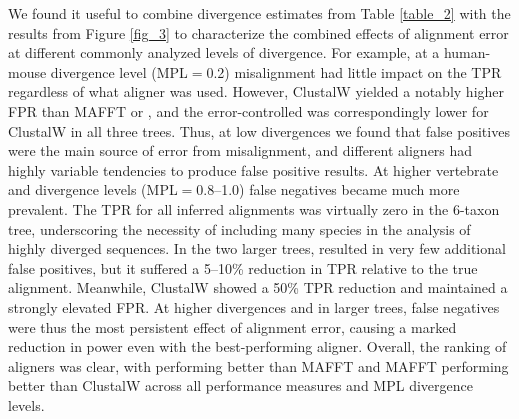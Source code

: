 \documentclass{article}
\begin{document}
We found it useful to combine divergence estimates from Table
\ref{table_2} with the results from Figure \ref{fig_3} to characterize
the combined effects of alignment error at different commonly analyzed
levels of divergence. For example, at a human-mouse divergence level
(MPL$=$0.2) misalignment had little impact on the TPR regardless of
what aligner was used. However, ClustalW yielded a notably higher FPR
than MAFFT or \prankc, and the error-controlled \tpr{} was
correspondingly lower for ClustalW in all three trees. Thus, at low
divergences we found that false positives were the main source of
error from misalignment, and different aligners had highly variable
tendencies to produce false positive results. At higher vertebrate and
\Dr divergence levels (MPL$=$0.8--1.0) false negatives became much
more prevalent. The TPR for all inferred alignments was virtually zero
in the 6-taxon tree, underscoring the necessity of including many
species in the analysis of highly diverged sequences. In the two
larger trees, \prankc resulted in very few additional false positives,
but it suffered a 5--10\% reduction in TPR relative to the true
alignment. Meanwhile, ClustalW showed a 50\% TPR reduction and
maintained a strongly elevated FPR. At higher divergences and in
larger trees, false negatives were thus the most persistent effect of
alignment error, causing a marked reduction in \sw power even with the
best-performing aligner. Overall, the ranking of aligners was clear,
with \prankc performing better than MAFFT and MAFFT performing better
than ClustalW across all performance measures and MPL divergence
levels.
\end{document}
